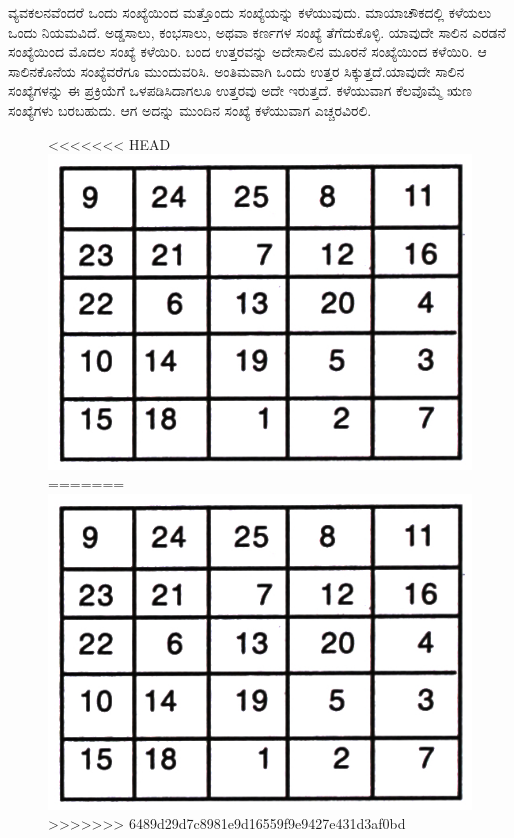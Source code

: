 ವ್ಯವಕಲನವೆಂದರೆ ಒಂದು ಸಂಖ್ಯೆಯಿಂದ ಮತ್ತೊಂದು ಸಂಖ್ಯೆಯನ್ನು ಕಳೆಯುವುದು. ಮಾಯಾ\-ಚೌಕದಲ್ಲಿ ಕಳೆಯಲು ಒಂದು ನಿಯಮವಿದೆ. ಅಡ್ಡಸಾಲು, ಕಂಭಸಾಲು, ಅಥವಾ ಕರ್ಣಗಳ ಸಂಖ್ಯೆ ತೆಗೆದುಕೊಳ್ಳಿ. ಯಾವುದೇ ಸಾಲಿನ ಎರಡನೆ ಸಂಖ್ಯೆಯಿಂದ ಮೊದಲ ಸಂಖ್ಯೆ ಕಳೆಯಿರಿ. ಬಂದ ಉತ್ತರವನ್ನು ಅದೇಸಾಲಿನ ಮೂರನೆ ಸಂಖ್ಯೆಯಿಂದ ಕಳೆಯಿರಿ. ಆ ಸಾಲಿನ\break ಕೊನೆಯ ಸಂಖ್ಯೆವರೆಗೂ ಮುಂದುವರಿಸಿ. ಅಂತಿಮವಾಗಿ ಒಂದು ಉತ್ತರ ಸಿಕ್ಕುತ್ತದೆ.\break ಯಾವುದೇ ಸಾಲಿನ ಸಂಖ್ಯೆಗಳನ್ನು ಈ ಪ್ರಕ್ರಿಯೆಗೆ ಒಳಪಡಿಸಿದಾಗಲೂ ಉತ್ತರವು ಅದೇ ಇರುತ್ತದೆ. ಕಳೆಯುವಾಗ ಕೆಲವೊಮ್ಮೆ ಋಣ ಸಂಖ್ಯೆಗಳು ಬರಬಹುದು. ಆಗ ಅದನ್ನು ಮುಂದಿನ ಸಂಖ್ಯೆ ಕಳೆಯುವಾಗ ಎಚ್ಚರವಿರಲಿ.
\begin{figure}[H]
<<<<<<< HEAD
\includegraphics{src/figures/chap7/fig7-24.jpg}
=======
\includegraphics[scale=0.8]{src/figures/chap7/fig7.24.jpg}
>>>>>>> 6489d29d7c8981e9d16559f9e9427e431d3af0bd
\end{figure}

